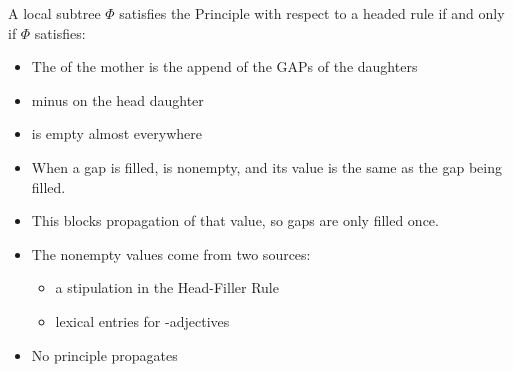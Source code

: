\documentclass[a4paper,landscape,headrule,footrule]{foils}
\begin{document}
A local subtree $\Phi$ satisfies the  Principle with respect to a
headed rule  if and only if $\Phi$ satisfies:




\begin{itemize}
\item The  of the mother is the append of the GAPs of the daughters
\item [\ldots{}] minus \ft{stop-gap} on the head daughter
 
\end{itemize}


\begin{itemize}
\item {} is empty almost everywhere
\item When a gap is filled, \ft{stop-gap} is nonempty,
and its value is the same as the gap being filled.
\item This blocks propagation of that  value, so
gaps are only filled once.
\item The nonempty  values come from two
  sources:
  \begin{itemize}
  \item a stipulation in the Head-Filler Rule
  \item lexical entries for -adjectives
  \end{itemize}
\item No principle propagates 
\end{itemize}
\end{document}
